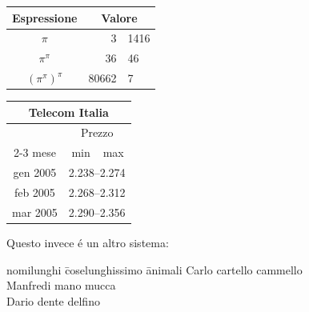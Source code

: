 \documentclass[12pt]{article}
\begin{document}
\bigskip\bigskip

\begin{tabular}{c r @{,} l}
Espressione &
\multicolumn{2}{c}{Valore}\\
\hline
$\pi$ & 3&1416 \\
$\pi^{\pi}$ & 36&46 \\
$(\pi^{\pi})^{\pi}$ & 80662&7\\
\end{tabular}

\bigskip\bigskip

\begin{center}
\begin{tabular}{|c||r|c|}
\hline
\multicolumn{3}{|c|}{Telecom Italia}\\
\hline
\hline
&\multicolumn{2}{c|}{Prezzo}\\
\cline{2-3}
mese&min&max\\
\hline
gen 2005&\multicolumn{2}{c|}{2.238--2.274}\\
\hline
feb 2005&\multicolumn{2}{c|}{2.268--2.312}\\
\hline
mar 2005&\multicolumn{2}{c|}{2.290--2.356}\\
\hline
\end{tabular}
\end{center}

\bigskip\bigskip
Questo invece \'e un altro sistema:

\bigskip

\begin{tabbing}
  nomilunghi \= coselunghissimo \= animali \kill
Carlo \> cartello \> cammello \\
Manfredi \> mano \> mucca \\
  Dario \> dente \> delfino 
\end{tabbing}
\end{document}
